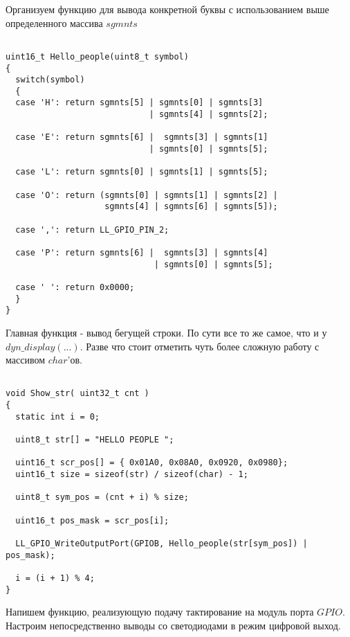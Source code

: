 Организуем функцию для вывода конкретной буквы с использованием выше определенного массива $sgmnts$

\begin{verbatim}
    
uint16_t Hello_people(uint8_t symbol)
{
  switch(symbol)
  {
  case 'H': return sgmnts[5] | sgmnts[0] | sgmnts[3] 
                             | sgmnts[4] | sgmnts[2];
  
  case 'E': return sgmnts[6] |  sgmnts[3] | sgmnts[1] 
                             | sgmnts[0] | sgmnts[5];
  
  case 'L': return sgmnts[0] | sgmnts[1] | sgmnts[5];
  
  case 'O': return (sgmnts[0] | sgmnts[1] | sgmnts[2] |
                    sgmnts[4] | sgmnts[6] | sgmnts[5]);
            
  case ',': return LL_GPIO_PIN_2; 
  
  case 'P': return sgmnts[6] |  sgmnts[3] | sgmnts[4] 
                              | sgmnts[0] | sgmnts[5];
  
  case ' ': return 0x0000;
  }
}

\end{verbatim}

Главная функция - вывод бегущей строки. По сути все то же самое, что и у $dyn\_display(...)$. Разве что стоит отметить чуть более сложную работу с массивом $char$'ов.

\begin{verbatim}
    
void Show_str( uint32_t cnt )
{
  static int i = 0;

  uint8_t str[] = "HELLO PEOPLE ";
  
  uint16_t scr_pos[] = { 0x01A0, 0x08A0, 0x0920, 0x0980};
  uint16_t size = sizeof(str) / sizeof(char) - 1;

  uint8_t sym_pos = (cnt + i) % size;
 
  uint16_t pos_mask = scr_pos[i];

  LL_GPIO_WriteOutputPort(GPIOB, Hello_people(str[sym_pos]) | pos_mask);
  
  i = (i + 1) % 4;
}

\end{verbatim}

Напишем функцию, реализующую подачу тактирование на модуль порта $GPIO$. Настроим непосредственно выводы со светодиодами в режим цифровой выход.

